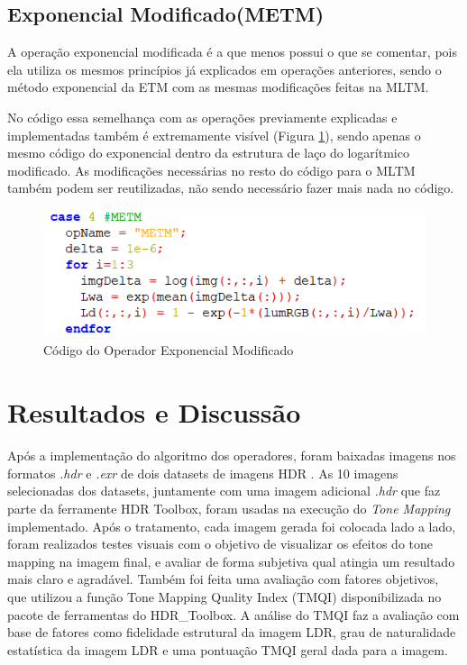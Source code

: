 \documentclass[conference]{IEEEtran}
\begin{document}
\subsection{Exponencial Modificado(METM)}

A operação exponencial modificada é a que menos possui o que se comentar, pois ela utiliza os mesmos princípios já explicados em operações anteriores, sendo o método exponencial da ETM com as mesmas modificações feitas na MLTM.

No código essa semelhança com as operações previamente explicadas e implementadas também é extremamente visível (Figura \ref{METM}), sendo apenas o mesmo código do exponencial dentro da estrutura de laço do logarítmico modificado. As modificações necessárias no resto do código para o MLTM também podem ser reutilizadas, não sendo necessário fazer mais nada no código.

\begin{figure}[!htpb]
    \centering
    \includegraphics[scale=.45]{Imagens/metmcod.png}
    \caption{Código do Operador Exponencial Modificado}
    \label{METM}
\end{figure}


\section{Resultados e Discussão}

Após a implementação do algoritmo dos operadores, foram baixadas imagens nos formatos \textit{.hdr} e \textit{.exr} de dois datasets de imagens HDR \cite{Mantiuk:2007} \cite{HDR_Dataset}. As 10 imagens selecionadas dos datasets, juntamente com uma imagem adicional \textit{.hdr} que faz parte da ferramente HDR Toolbox, foram usadas na execução do \textit{Tone Mapping} implementado. Após o tratamento, cada imagem gerada foi colocada lado a lado, foram realizados testes visuais com o objetivo de visualizar os efeitos do tone mapping na imagem final, e avaliar de forma subjetiva qual atingia um resultado mais claro e agradável. Também foi feita uma avaliação com fatores objetivos, que utilizou a função Tone Mapping Quality Index (TMQI) \cite{TMQI} disponibilizada no pacote de ferramentas do HDR\_Toolbox. A análise do TMQI faz a avaliação com base de fatores como fidelidade estrutural da imagem LDR, grau de naturalidade estatística da imagem LDR e uma pontuação TMQI geral dada para a imagem.
\end{document}
